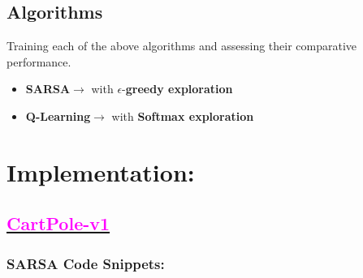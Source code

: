 \documentclass[11pt, a4]{article}
\begin{document}
		\subsection{Algorithms}
		Training each of the above algorithms and assessing their comparative performance.
		\begin{itemize}
			\item \textbf{SARSA}$\rightarrow$ with $\epsilon$-\textbf{greedy exploration}
			\item \textbf{Q-Learning}$\rightarrow$ with \textbf{Softmax exploration}
		\end{itemize}
	\section{Implementation:}
		\subsection{\href{https://github.com/RitabrataMandal/RL-DA6400-assignment_1}{\textcolor{magenta}{CartPole-v1}}}
			\subsubsection{SARSA Code Snippets:}
				
				
				\newpage
\end{document}
